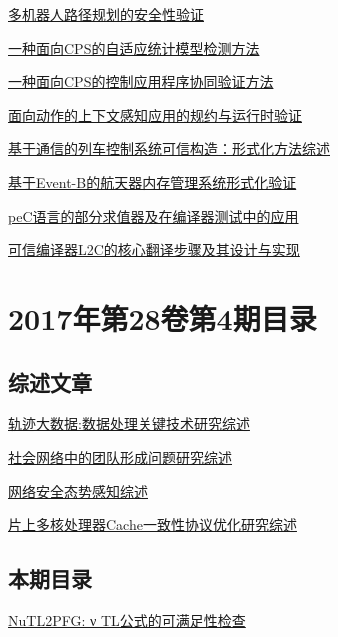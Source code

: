\documentclass[a4paper]{article}
\begin{document}
\href{http://www.jos.org.cn/ch/reader/create_pdf.aspx?file_no=5207&year_id=2017&quarter_id=5&falg=1}{多机器人路径规划的安全性验证}

\href{http://www.jos.org.cn/ch/reader/create_pdf.aspx?file_no=5216&year_id=2017&quarter_id=5&falg=1}{一种面向CPS的自适应统计模型检测方法}

\href{http://www.jos.org.cn/ch/reader/create_pdf.aspx?file_no=5214&year_id=2017&quarter_id=5&falg=1}{一种面向CPS的控制应用程序协同验证方法}

\href{http://www.jos.org.cn/ch/reader/create_pdf.aspx?file_no=5215&year_id=2017&quarter_id=5&falg=1}{面向动作的上下文感知应用的规约与运行时验证}

\href{http://www.jos.org.cn/ch/reader/create_pdf.aspx?file_no=5217&year_id=2017&quarter_id=5&falg=1}{基于通信的列车控制系统可信构造：形式化方法综述}

\href{http://www.jos.org.cn/ch/reader/create_pdf.aspx?file_no=5218&year_id=2017&quarter_id=5&falg=1}{基于Event-B的航天器内存管理系统形式化验证}

\href{http://www.jos.org.cn/ch/reader/create_pdf.aspx?file_no=5206&year_id=2017&quarter_id=5&falg=1}{peC语言的部分求值器及在编译器测试中的应用}

\href{http://www.jos.org.cn/ch/reader/create_pdf.aspx?file_no=5213&year_id=2017&quarter_id=5&falg=1}{可信编译器L2C的核心翻译步骤及其设计与实现}


\section{\textbf{2017年第28卷第4期目录}}
\subsection{综述文章}
\href{http://www.jos.org.cn/ch/reader/create_pdf.aspx?file_no=5143&year_id=2017&quarter_id=4&falg=1}{轨迹大数据:数据处理关键技术研究综述}

\href{http://www.jos.org.cn/ch/reader/create_pdf.aspx?file_no=5152&year_id=2017&quarter_id=4&falg=1}{社会网络中的团队形成问题研究综述}

\href{http://www.jos.org.cn/ch/reader/create_pdf.aspx?file_no=5142&year_id=2017&quarter_id=4&falg=1}{网络安全态势感知综述}

\href{http://www.jos.org.cn/ch/reader/create_pdf.aspx?file_no=5245&year_id=2017&quarter_id=4&falg=1}{片上多核处理器Cache一致性协议优化研究综述}

\subsection{本期目录}
\href{http://www.jos.org.cn/ch/reader/create_pdf.aspx?file_no=5057&year_id=2017&quarter_id=4&falg=1}{NuTL2PFG: ν TL公式的可满足性检查}
\end{document}

